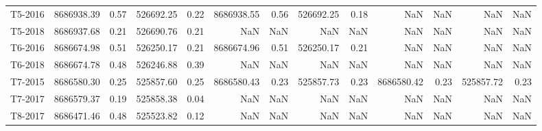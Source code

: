 \begin{tabular}{lrrrrrrrrrrrr}
     T5-2016 &                8686938.39 &                            0.57 &                526692.25 &                           0.22 &                8686938.55 &                            0.56 &                526692.25 &                           0.18 &                       NaN &                             NaN &                      NaN &                            NaN \\
     T5-2018 &                8686937.68 &                            0.21 &                526690.76 &                           0.21 &                       NaN &                             NaN &                      NaN &                            NaN &                       NaN &                             NaN &                      NaN &                            NaN \\
     T6-2016 &                8686674.98 &                            0.51 &                526250.17 &                           0.21 &                8686674.96 &                            0.51 &                526250.17 &                           0.21 &                       NaN &                             NaN &                      NaN &                            NaN \\
     T6-2018 &                8686674.78 &                            0.48 &                526246.88 &                           0.39 &                       NaN &                             NaN &                      NaN &                            NaN &                       NaN &                             NaN &                      NaN &                            NaN \\
     T7-2015 &                8686580.30 &                            0.25 &                525857.60 &                           0.25 &                8686580.43 &                            0.23 &                525857.73 &                           0.23 &                8686580.42 &                            0.23 &                525857.72 &                           0.23 \\
     T7-2017 &                8686579.37 &                            0.19 &                525858.38 &                           0.04 &                       NaN &                             NaN &                      NaN &                            NaN &                       NaN &                             NaN &                      NaN &                            NaN \\
     T8-2017 &                8686471.46 &                            0.48 &                525523.82 &                           0.12 &                       NaN &                             NaN &                      NaN &                            NaN &                       NaN &                             NaN &                      NaN &                            NaN \\
\bottomrule
\end{tabular}
